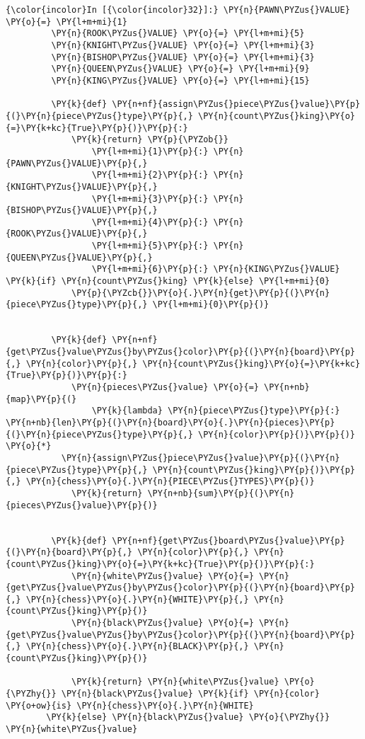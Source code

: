 \begin{Verbatim}[commandchars=\\\{\}]
{\color{incolor}In [{\color{incolor}32}]:} \PY{n}{PAWN\PYZus{}VALUE} \PY{o}{=} \PY{l+m+mi}{1}
         \PY{n}{ROOK\PYZus{}VALUE} \PY{o}{=} \PY{l+m+mi}{5}
         \PY{n}{KNIGHT\PYZus{}VALUE} \PY{o}{=} \PY{l+m+mi}{3}
         \PY{n}{BISHOP\PYZus{}VALUE} \PY{o}{=} \PY{l+m+mi}{3}
         \PY{n}{QUEEN\PYZus{}VALUE} \PY{o}{=} \PY{l+m+mi}{9}
         \PY{n}{KING\PYZus{}VALUE} \PY{o}{=} \PY{l+m+mi}{15}
         
         \PY{k}{def} \PY{n+nf}{assign\PYZus{}piece\PYZus{}value}\PY{p}{(}\PY{n}{piece\PYZus{}type}\PY{p}{,} \PY{n}{count\PYZus{}king}\PY{o}{=}\PY{k+kc}{True}\PY{p}{)}\PY{p}{:}
             \PY{k}{return} \PY{p}{\PYZob{}}
                 \PY{l+m+mi}{1}\PY{p}{:} \PY{n}{PAWN\PYZus{}VALUE}\PY{p}{,}
                 \PY{l+m+mi}{2}\PY{p}{:} \PY{n}{KNIGHT\PYZus{}VALUE}\PY{p}{,}
                 \PY{l+m+mi}{3}\PY{p}{:} \PY{n}{BISHOP\PYZus{}VALUE}\PY{p}{,}
                 \PY{l+m+mi}{4}\PY{p}{:} \PY{n}{ROOK\PYZus{}VALUE}\PY{p}{,}
                 \PY{l+m+mi}{5}\PY{p}{:} \PY{n}{QUEEN\PYZus{}VALUE}\PY{p}{,}
                 \PY{l+m+mi}{6}\PY{p}{:} \PY{n}{KING\PYZus{}VALUE} \PY{k}{if} \PY{n}{count\PYZus{}king} \PY{k}{else} \PY{l+m+mi}{0}
             \PY{p}{\PYZcb{}}\PY{o}{.}\PY{n}{get}\PY{p}{(}\PY{n}{piece\PYZus{}type}\PY{p}{,} \PY{l+m+mi}{0}\PY{p}{)}
         
         
         \PY{k}{def} \PY{n+nf}{get\PYZus{}value\PYZus{}by\PYZus{}color}\PY{p}{(}\PY{n}{board}\PY{p}{,} \PY{n}{color}\PY{p}{,} \PY{n}{count\PYZus{}king}\PY{o}{=}\PY{k+kc}{True}\PY{p}{)}\PY{p}{:}
             \PY{n}{pieces\PYZus{}value} \PY{o}{=} \PY{n+nb}{map}\PY{p}{(}
                 \PY{k}{lambda} \PY{n}{piece\PYZus{}type}\PY{p}{:} \PY{n+nb}{len}\PY{p}{(}\PY{n}{board}\PY{o}{.}\PY{n}{pieces}\PY{p}{(}\PY{n}{piece\PYZus{}type}\PY{p}{,} \PY{n}{color}\PY{p}{)}\PY{p}{)} \PY{o}{*} 
		   \PY{n}{assign\PYZus{}piece\PYZus{}value}\PY{p}{(}\PY{n}{piece\PYZus{}type}\PY{p}{,} \PY{n}{count\PYZus{}king}\PY{p}{)}\PY{p}{,} \PY{n}{chess}\PY{o}{.}\PY{n}{PIECE\PYZus{}TYPES}\PY{p}{)}
             \PY{k}{return} \PY{n+nb}{sum}\PY{p}{(}\PY{n}{pieces\PYZus{}value}\PY{p}{)}
         
         
         \PY{k}{def} \PY{n+nf}{get\PYZus{}board\PYZus{}value}\PY{p}{(}\PY{n}{board}\PY{p}{,} \PY{n}{color}\PY{p}{,} \PY{n}{count\PYZus{}king}\PY{o}{=}\PY{k+kc}{True}\PY{p}{)}\PY{p}{:}
             \PY{n}{white\PYZus{}value} \PY{o}{=} \PY{n}{get\PYZus{}value\PYZus{}by\PYZus{}color}\PY{p}{(}\PY{n}{board}\PY{p}{,} \PY{n}{chess}\PY{o}{.}\PY{n}{WHITE}\PY{p}{,} \PY{n}{count\PYZus{}king}\PY{p}{)}
             \PY{n}{black\PYZus{}value} \PY{o}{=} \PY{n}{get\PYZus{}value\PYZus{}by\PYZus{}color}\PY{p}{(}\PY{n}{board}\PY{p}{,} \PY{n}{chess}\PY{o}{.}\PY{n}{BLACK}\PY{p}{,} \PY{n}{count\PYZus{}king}\PY{p}{)}
         
             \PY{k}{return} \PY{n}{white\PYZus{}value} \PY{o}{\PYZhy{}} \PY{n}{black\PYZus{}value} \PY{k}{if} \PY{n}{color} \PY{o+ow}{is} \PY{n}{chess}\PY{o}{.}\PY{n}{WHITE} 
		\PY{k}{else} \PY{n}{black\PYZus{}value} \PY{o}{\PYZhy{}} \PY{n}{white\PYZus{}value}
\end{Verbatim}

